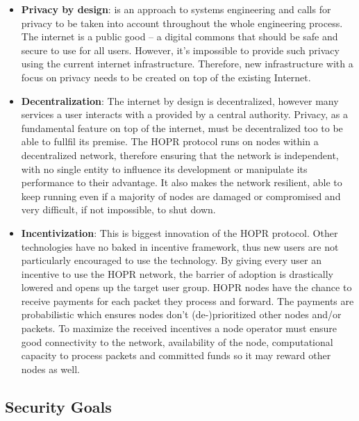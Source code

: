 \begin{itemize}

    \item \textbf{Privacy by design}: is an approach to systems engineering and
        calls for privacy to be taken into account throughout the whole
        engineering process. The internet is a public good –
        a digital commons that should be safe and secure to use for all users.
        However, it's impossible to provide such privacy using the current
        internet infrastructure. Therefore, new infrastructure with a focus
        on privacy needs to be created on top of the existing Internet.

    \item \textbf{Decentralization}: The internet by design is decentralized,
        however many services a user interacts with a provided by a central
        authority. Privacy, as a fundamental feature on top of the internet,
        must be decentralized too to be able to fullfil its premise.
        The HOPR protocol runs on nodes within a decentralized network,
        therefore ensuring that the network is independent, with no single
        entity to influence its development or manipulate its performance to
        their advantage. It also makes the network resilient, able to keep
        running even if a majority of nodes are damaged or compromised and very
        difficult, if not impossible, to shut down.

    \item \textbf{Incentivization}: This is biggest innovation of the HOPR
        protocol. Other technologies have no baked in incentive framework, thus
        new users are not particularly encouraged to use the technology. By
        giving every user an incentive to use the HOPR network, the barrier of
        adoption is drastically lowered and opens up the target user group. HOPR
        nodes have the chance to receive payments for each packet they process
        and forward. The payments are probabilistic which ensures nodes don't
        (de-)prioritized other nodes and/or packets. To maximize the received
        incentives a node operator must ensure good connectivity to the network,
        availability of the node, computational capacity to process packets and
        committed funds so it may reward other nodes as
        well.

\end{itemize}

\subsection{Security Goals}
\label{sec:securitygoals}

